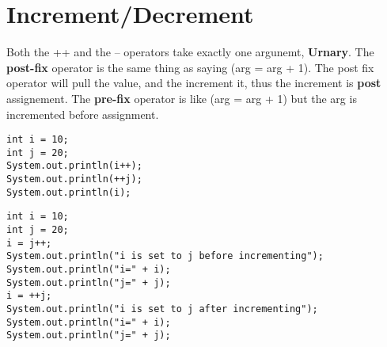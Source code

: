 \documentclass[11pt]{article}
\begin{document}
\section{Increment/Decrement}
\label{sec:org0317b77}
Both the ++ and the -- operators take exactly one argunemt, \textbf{Urnary}. The \textbf{post-fix} operator is the same thing as saying (arg = arg + 1). The post fix operator will pull the value, and the increment it, thus the increment is \textbf{post} assignement. The \textbf{pre-fix} operator is like (arg = arg + 1) but the arg is incremented before assignment. 
\begin{verbatim}
int i = 10;
int j = 20;
System.out.println(i++);
System.out.println(++j);
System.out.println(i);
\end{verbatim}

\begin{verbatim}
int i = 10;
int j = 20;
i = j++;
System.out.println("i is set to j before incrementing");
System.out.println("i=" + i);
System.out.println("j=" + j);
i = ++j;
System.out.println("i is set to j after incrementing");
System.out.println("i=" + i);
System.out.println("j=" + j);
\end{verbatim}
\end{document}
